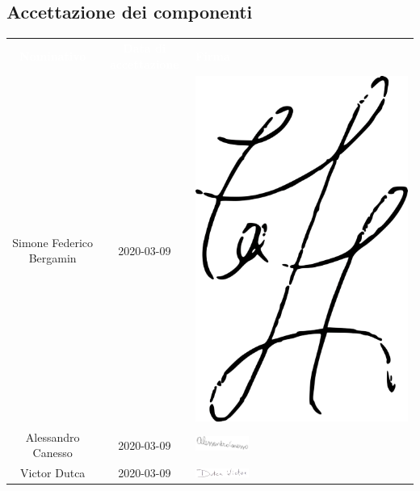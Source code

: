 \subsection{Accettazione dei componenti}
\begin{table}[H]	
	\begin{center}
	\begin{tabular}{ c c C{6cm}}
		\textcolor{white}{\textbf{Nominativo}} & \textcolor{white}{\textbf{Data di accettazione}} & \textcolor{white}{\textbf{Firma}} \\
		Simone Federico Bergamin & 2020-03-09 & \includegraphics[scale=0.4]{img/firme/bergamin.png}\\
		Alessandro Canesso & 2020-03-09 & \includegraphics[scale=0.3, width=0.25\textwidth]{img/firme/canesso.png}\\
		Victor Dutca & 2020-03-09 & \includegraphics[scale=0.3, width=0.25\textwidth]{img/firme/dutca.png}\\

\end{tabular}
\end{center}
\end{table}
